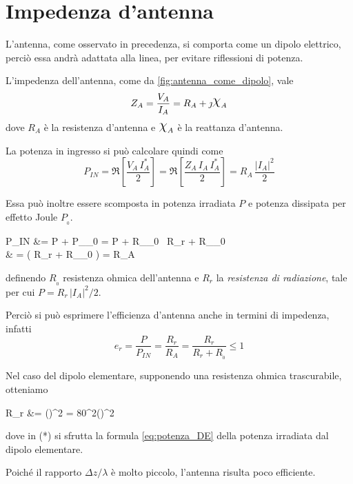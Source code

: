 \section{Impedenza d'antenna}
L'antenna, come osservato in precedenza, si comporta come un dipolo elettrico, perciò essa andrà adattata alla linea, per evitare riflessioni di potenza.

L'impedenza dell'antenna, come da \autoref{fig:antenna_come_dipolo}, vale
\begin{equation}
	Z_A = \frac{V_A}{I_A} = R_A + \jmath \Chi_A
\end{equation}
dove $R_A$ è la resistenza d'antenna e $\Chi_A$ è la reattanza d'antenna.

La potenza in ingresso si può calcolare quindi come
\begin{equation*}
	P_{IN}
	= \Re \left[ \frac{V_A \, I_A^*}{2} \right]
	= \Re \left[ \frac{Z_A \, I_A \, I_A^*}{2} \right]
	= R_A \, \frac{|I_A|^2}{2}
\end{equation*}

Essa può inoltre essere scomposta in potenza irradiata $P$ e potenza dissipata per effetto Joule $P_{_0}$.
\begin{esp*}
	P_{IN}
	&= P + P_{_0}
	= P + R_{_0} \, 
	\stackrel{(*)}{=} R_r  + R_{_0} \\
	& = \left( R_r + R_{_0}  \right) 
	= R_A \, 
\end{esp*}
definendo $R_{_0}$ resistenza ohmica dell'antenna e $R_r$ la \emph{resistenza di radiazione}, tale per cui $P=R_r \, |I_A|^2 / 2$.

Perciò si può esprimere l'efficienza d'antenna anche in termini di impedenza, infatti
\begin{equation*}
	e_r
	= \frac{P}{P_{IN}}
	= \frac{R_r}{R_A}
	= \frac{R_r}{R_r + R_{_0}}
	\le 1
\end{equation*}

Nel caso del dipolo elementare, supponendo una resistenza ohmica trascurabile, otteniamo

\begin{esp}\label{eq:pot-resRadDE}
	R_r
	&= 
	\stackrel{(*)}{=} \pi \eta \left(\right)^2
	= 80\pi^2\left(\right)^2 \Omega
\end{esp}
dove in (*) si sfrutta la formula \autoref{eq:potenza_DE} della potenza irradiata dal dipolo elementare.

Poiché il rapporto $\Delta z / \lambda$ è molto piccolo, l'antenna risulta poco efficiente.


